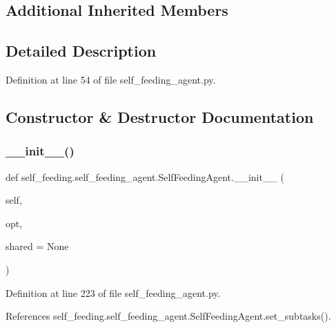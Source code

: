 \subsection*{Additional Inherited Members}


\subsection{Detailed Description}


Definition at line 54 of file self\+\_\+feeding\+\_\+agent.\+py.



\subsection{Constructor \& Destructor Documentation}
\mbox{\label{classself__feeding_1_1self__feeding__agent_1_1SelfFeedingAgent_ac76dc7e656c40b4209513286a5b1b2d9}} 
\subsubsection{\texorpdfstring{\+\_\+\+\_\+init\+\_\+\+\_\+()}{\_\_init\_\_()}}
{\footnotesize\ttfamily def self\+\_\+feeding.\+self\+\_\+feeding\+\_\+agent.\+Self\+Feeding\+Agent.\+\_\+\+\_\+init\+\_\+\+\_\+ (\begin{DoxyParamCaption}\item[{}]{self,  }\item[{}]{opt,  }\item[{}]{shared = {\ttfamily None} }\end{DoxyParamCaption})}



Definition at line 223 of file self\+\_\+feeding\+\_\+agent.\+py.



References self\+\_\+feeding.\+self\+\_\+feeding\+\_\+agent.\+Self\+Feeding\+Agent.\+set\+\_\+subtasks().

